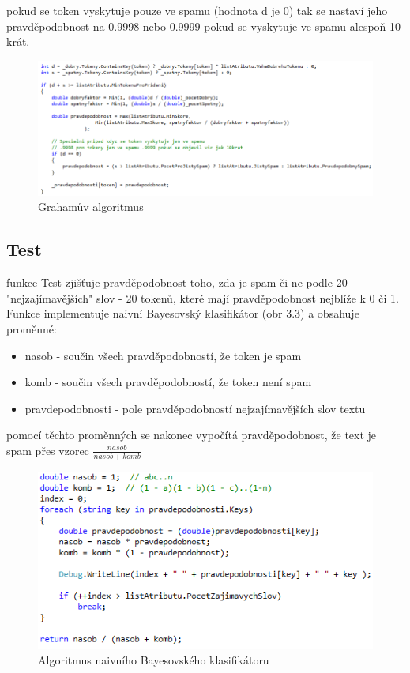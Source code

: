 \documentclass{semestralka}
\begin{document}
pokud se token vyskytuje pouze ve spamu (hodnota d je 0) tak se nastaví jeho pravděpodobnost na 0.9998 nebo 0.9999 pokud se vyskytuje ve spamu alespoň 10-krát.

\begin{figure}[!ht]
  \centering
    \includegraphics[width=\textwidth]{grahamAlgorithm.png}
    \caption{Grahamův algoritmus}
\end{figure}

\subsection{Test}
funkce Test zjišťuje pravděpodobnost toho, zda je spam či ne podle 20 "nejzajímavějších" slov - 20 tokenů, které mají pravděpodobnost nejblíže k 0 či 1. Funkce implementuje naivní Bayesovský klasifikátor (obr 3.3) a obsahuje proměnné:

\begin{itemize}
\item
nasob - součin všech pravděpodobností, že token je spam
\item
komb - součin všech pravděpodobností, že token není spam
\item
pravdepodobnosti - pole pravděpodobností nejzajímavějších slov textu
\end{itemize}

pomocí těchto proměnných se nakonec vypočítá pravděpodobnost, že text je spam přes vzorec $\frac{nasob}{nasob + komb}$

\begin{figure}[!ht]
  \centering
    \includegraphics[width=\textwidth]{naiveBayes.png}
    \caption{Algoritmus naivního Bayesovského klasifikátoru}
\end{figure}
\end{document}
